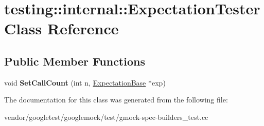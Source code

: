 \hypertarget{classtesting_1_1internal_1_1_expectation_tester}{}\section{testing\+:\+:internal\+:\+:Expectation\+Tester Class Reference}
\label{classtesting_1_1internal_1_1_expectation_tester}
\subsection*{Public Member Functions}
\begin{DoxyCompactItemize}
\item 
\mbox{\label{classtesting_1_1internal_1_1_expectation_tester_af5d762355ef83f414c4b0fc14c8fc943}} 
void {\bfseries Set\+Call\+Count} (int n, \mbox{\hyperlink{classtesting_1_1internal_1_1_expectation_base}{Expectation\+Base}} $\ast$exp)
\end{DoxyCompactItemize}


The documentation for this class was generated from the following file\+:\begin{DoxyCompactItemize}
\item 
vendor/googletest/googlemock/test/gmock-\/spec-\/builders\+\_\+test.\+cc\end{DoxyCompactItemize}
